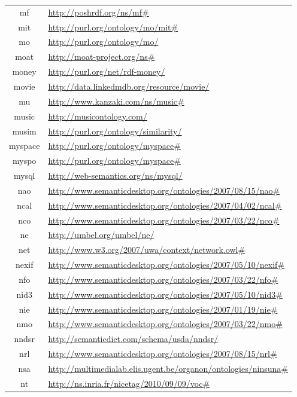 \documentclass{article}
\begin{document}
\begin{longtable}{ c | p{8cm} }
		mf & \url{http://poshrdf.org/ns/mf#} \\
		mit & \url{http://purl.org/ontology/mo/mit#} \\
		mo & \url{http://purl.org/ontology/mo/} \\
		moat & \url{http://moat-project.org/ns#} \\
		money & \url{http://purl.org/net/rdf-money/} \\
		movie & \url{http://data.linkedmdb.org/resource/movie/} \\
		mu & \url{http://www.kanzaki.com/ns/music#} \\
		music & \url{http://musicontology.com/} \\
		musim & \url{http://purl.org/ontology/similarity/} \\
		myspace & \url{http://purl.org/ontology/myspace#} \\
		myspo & \url{http://purl.org/ontology/myspace#} \\
		mysql & \url{http://web-semantics.org/ns/mysql/} \\
		nao & \url{http://www.semanticdesktop.org/ontologies/2007/08/15/nao#} \\
		ncal & \url{http://www.semanticdesktop.org/ontologies/2007/04/02/ncal#} \\
		nco & \url{http://www.semanticdesktop.org/ontologies/2007/03/22/nco#} \\
		ne & \url{http://umbel.org/umbel/ne/} \\
		net & \url{http://www.w3.org/2007/uwa/context/network.owl#} \\
		nexif & \url{http://www.semanticdesktop.org/ontologies/2007/05/10/nexif#} \\
		nfo & \url{http://www.semanticdesktop.org/ontologies/2007/03/22/nfo#} \\
		nid3 & \url{http://www.semanticdesktop.org/ontologies/2007/05/10/nid3#} \\
		nie & \url{http://www.semanticdesktop.org/ontologies/2007/01/19/nie#} \\
		nmo & \url{http://www.semanticdesktop.org/ontologies/2007/03/22/nmo#} \\
		nndsr & \url{http://semanticdiet.com/schema/usda/nndsr/} \\
		nrl & \url{http://www.semanticdesktop.org/ontologies/2007/08/15/nrl#} \\
		nsa & \url{http://multimedialab.elis.ugent.be/organon/ontologies/ninsuna#} \\
		nt & \url{http://ns.inria.fr/nicetag/2010/09/09/voc#} \\

\end{longtable}
\end{document}
